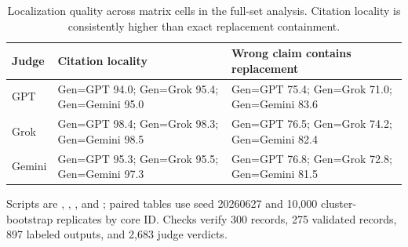 \begin{table}[H]
\centering
\scriptsize
\begin{tabularx}{\linewidth}{@{}L{1.0cm}Y Y@{}}
\toprule
Judge & Citation locality & Wrong claim contains replacement \\
\midrule
GPT & Gen=GPT 94.0; Gen=Grok 95.4; Gen=Gemini 95.0 & Gen=GPT 75.4; Gen=Grok 71.0; Gen=Gemini 83.6 \\
Grok & Gen=GPT 98.4; Gen=Grok 98.3; Gen=Gemini 98.5 & Gen=GPT 76.5; Gen=Grok 74.2; Gen=Gemini 82.4 \\
Gemini & Gen=GPT 95.3; Gen=Grok 95.5; Gen=Gemini 97.3 & Gen=GPT 76.8; Gen=Grok 72.8; Gen=Gemini 81.5 \\
\bottomrule
\end{tabularx}
\caption{Localization quality across matrix cells in the full-set analysis. Citation locality is consistently higher than exact replacement containment.}
\label{tab:localization}
\end{table}

Scripts are , , , and ; paired tables use seed 20260627 and 10,000 cluster-bootstrap replicates by core ID. Checks verify 300 records, 275 validated records, 897 labeled outputs, and 2,683 judge verdicts.
